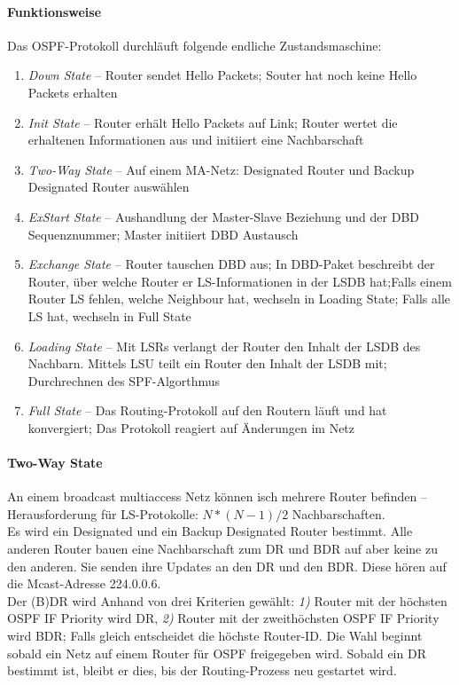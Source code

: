 \documentclass[a4paper,12pt]{article}
\begin{document}
\paragraph{Funktionsweise} Das OSPF-Protokoll durchläuft folgende endliche Zustandsmaschine:
\begin{enumerate}
\item \emph{Down State} -- Router sendet Hello Packets; Souter hat noch keine Hello Packets erhalten
\item \emph{Init State} -- Router erhält Hello Packets auf Link; Router wertet die erhaltenen Informationen aus und initiiert eine Nachbarschaft
\item \emph{Two-Way State} -- Auf einem MA-Netz: Designated Router und Backup Designated Router auswählen
\item \emph{ExStart State} -- Aushandlung der Master-Slave Beziehung und der DBD Sequenznummer; Master initiiert DBD Austausch
\item \emph{Exchange State} -- Router tauschen DBD aus; In DBD-Paket beschreibt der Router, über welche Router er LS-Informationen in der LSDB hat;Falls einem Router LS fehlen, welche Neighbour hat, wechseln in Loading State; Falls alle LS hat, wechseln in Full State
\item \emph{Loading State} -- Mit LSRs verlangt der Router den Inhalt der LSDB des Nachbarn. Mittels LSU teilt ein Router den Inhalt der LSDB mit; Durchrechnen des SPF-Algorthmus
\item \emph{Full State} -- Das Routing-Protokoll auf den Routern läuft und hat konvergiert; Das Protokoll reagiert auf Änderungen im Netz
\end{enumerate}

\paragraph{Two-Way State} An einem broadcast multiaccess Netz können isch mehrere Router befinden -- Herausforderung für LS-Protokolle: $N * (N-1) / 2$ Nachbarschaften.\\

Es wird ein Designated und ein Backup Designated Router bestimmt. Alle anderen Router bauen eine Nachbarschaft zum DR und BDR auf aber keine zu den anderen. Sie senden ihre Updates an den DR und den BDR. Diese hören auf die Mcast-Adresse 224.0.0.6.\\

Der (B)DR wird Anhand von drei Kriterien gewählt: \emph{1)} Router mit der höchsten OSPF IF Priority wird DR, \emph{2)} Router mit der zweithöchsten OSPF IF Priority wird BDR; Falls gleich entscheidet die höchste Router-ID. Die Wahl beginnt sobald ein Netz auf einem Router für OSPF freigegeben wird. Sobald ein DR bestimmt ist, bleibt er dies, bis der Routing-Prozess neu gestartet wird.
\end{document}
